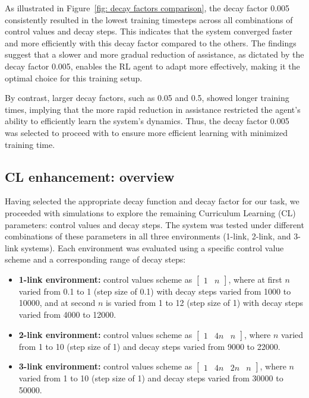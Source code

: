 As illustrated in Figure~\ref{fig: decay factors comparison}, the decay factor 0.005 consistently resulted in the lowest training timesteps across all combinations of control values and decay steps. This indicates that the system converged faster and more efficiently with this decay factor compared to the others. The findings suggest that a slower and more gradual reduction of assistance, as dictated by the decay factor 0.005, enables the RL agent to adapt more effectively, making it the optimal choice for this training setup. 

By contrast, larger decay factors, such as 0.05 and 0.5, showed longer training times, implying that the more rapid reduction in assistance restricted the agent's ability to efficiently learn the system's dynamics. Thus, the decay factor 0.005 was selected to proceed with to ensure more efficient learning with minimized training time.

\subsection{CL enhancement: overview} 

Having selected the appropriate decay function and decay factor for our task, we proceeded with simulations to explore the remaining Curriculum Learning (CL) parameters: control values and decay steps. The system was tested under different combinations of these parameters in all three environments (1-link, 2-link, and 3-link systems).
Each environment was evaluated using a specific control value scheme and a corresponding range of decay steps:
\begin{itemize}
	\item \textbf{1-link environment:} control values scheme as \(\begin{bmatrix} 1 & n \end{bmatrix}\), where at first $n$ varied from 0.1 to 1 (step size of 0.1) with decay steps varied from 1000 to 10000, and at second $n$ is varied from 1 to 12 (step size of 1) with decay steps varied from 4000 to 12000.
	\item \textbf{2-link environment:} control values scheme as \(\begin{bmatrix} 1 & 4n & n \end{bmatrix}\), where $n$ varied from 1 to 10 (step size of 1) and decay steps varied from 9000 to 22000.
	\item \textbf{3-link environment:} control values scheme as \(\begin{bmatrix} 1 & 4n & 2n & n \end{bmatrix}\), where $n$ varied from 1 to 10 (step size of 1) and decay steps varied from 30000 to 50000.
\end{itemize}

